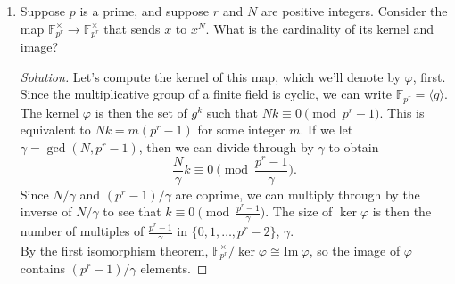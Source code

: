 \documentclass[11pt,letterpaper]{report}
\newcommand{\field}{\mathbb{F}}
\newenvironment{solution}
{\begin{proof}[Solution]}
{\end{proof}}
\begin{document}
\begin{enumerate}
\begin{solution}
		The possible invariant factor lists are then
		\[
		\{x,\ x,\ x(x^2+1)\},\quad \{x,\ x^2(x^2+1)\},\quad \{x^3(x^2+1)\}.
		\]
		Taking the direct sum of companion matrices gives these conjugacy classes, respectively.
		\[
		\begin{pmatrix*}[r]
			0 & 0 & 0 & 0 & 0\\
			0 & 0 & 0 & 0 & 0\\
			0 & 0 & 0 & 0 & 0\\
			0 & 0 & 1 & 0 & -1\\
			0 & 0 & 0 & 1 & 0
		\end{pmatrix*},\quad \begin{pmatrix*}[r]
			0 & 0 & 0 & 0 & 0\\
			0 & 0 & 0 & 0 & 0\\
			0 & 1 & 0 & 0 & 0\\
			0 & 0 & 1 & 0 & -1\\
			0 & 0 & 0 & 1 & 0
		\end{pmatrix*},\quad \begin{pmatrix*}[r]
			0 & 0 & 0 & 0 & 0\\
			1 & 0 & 0 & 0 & 0\\
			0 & 1 & 0 & 0 & 0\\
			0 & 0 & 1 & 0 & -1\\
			0 & 0 & 0 & 1 & 0
		\end{pmatrix*}.
		\]
	\end{solution}

	\item Suppose $p$ is a prime, and suppose $r$ and $N$ are positive integers. Consider the map $\field_{p^r}^\times \to \field_{p^r}^\times$ that sends $x$ to $x^N$. What is the cardinality of its kernel and image?
	\begin{solution}
		Let's compute the kernel of this map, which we'll denote by $\varphi$, first. Since the multiplicative group of a finite field is cyclic, we can write $\field_{p^r} = \langle g \rangle$. The kernel $\varphi$ is then the set of $g^k$ such that $Nk \equiv 0 \pmod{p^r-1}$.
		This is equivalent to $Nk = m(p^r-1)$ for some integer $m$. If we let $\gamma = \gcd(N, p^r-1)$, then we can divide through by $\gamma$ to obtain
		\[
		\frac{N}{\gamma}k\equiv 0 \pmod{\frac{p^r-1}{\gamma}}.
		\]
		Since $N/\gamma$ and $(p^r-1)/\gamma$ are coprime, we can multiply through by the inverse of $N/\gamma$ to see that $k \equiv 0 \pmod{\frac{p^r-1}{\gamma}}$. The size of $\ker \varphi$ is then the number of multiples of $\frac{p^r-1}{\gamma}$ in $\{0, 1, \ldots, p^r-2\}$, $\gamma$.\\

		\noindent By the first isomorphism theorem, $\field_{p^r}^\times/\ker \varphi \cong \text{Im}\ \varphi$, so the image of $\varphi$ contains $(p^r-1)/\gamma$ elements.
	\end{solution}
\end{enumerate}
\end{document}
